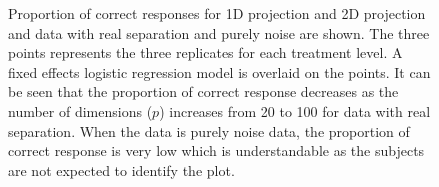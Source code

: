 \documentclass[12]{article}
\begin{document}
\begin{figure}[ht]
   \centering
      \caption{Proportion of correct responses for 1D projection and 2D projection and data with real separation and purely noise are shown. The three points represents the three replicates for each treatment level. A fixed effects logistic regression model is overlaid on the points. It can be seen that the proportion of correct response decreases as the number of dimensions ($p$) increases from 20 to 100 for data with real separation. When the data is purely noise data, the proportion of correct response is very low which is understandable as the subjects are not expected to identify the plot.  }
       \label{suc-rate-glm}
\end{figure}

\end{document}
